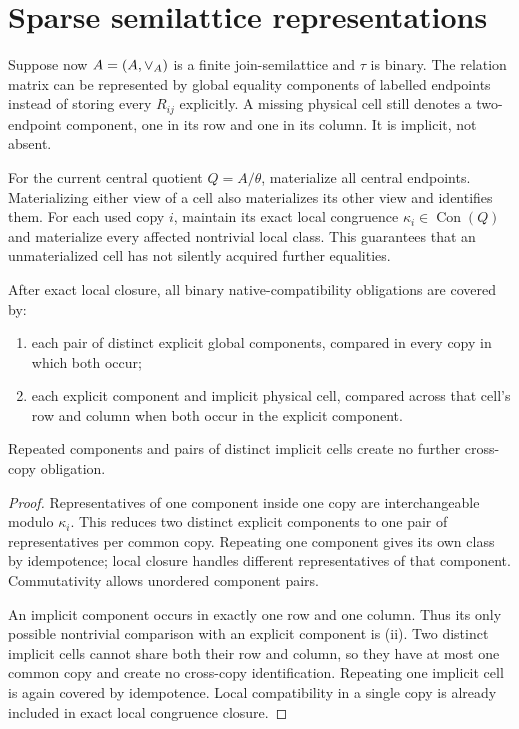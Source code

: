 \section{Sparse semilattice representations}\label{sec:sparse}

Suppose now $A=(A,\vee_A)$ is a finite join-semilattice and $\tau$ is binary. The relation matrix can be represented by global equality components of labelled endpoints instead of storing every $R_{ij}$ explicitly. A missing physical cell still denotes a two-endpoint component, one in its row and one in its column. It is implicit, not absent.

For the current central quotient $Q=A/\theta$, materialize all central endpoints. Materializing either view of a cell also materializes its other view and identifies them. For each used copy $i$, maintain its exact local congruence $\kappa_i\in\operatorname{Con}(Q)$ and materialize every affected nontrivial local class. This guarantees that an unmaterialized cell has not silently acquired further equalities.

\begin{lemma}\label{lem:coverage}
After exact local closure, all binary native-compatibility obligations are covered by:
\begin{enumerate}[label=(\roman*)]
\item each pair of distinct explicit global components, compared in every copy in which both occur;
\item each explicit component and implicit physical cell, compared across that cell's row and column when both occur in the explicit component.
\end{enumerate}
Repeated components and pairs of distinct implicit cells create no further cross-copy obligation.
\end{lemma}
\begin{proof}
Representatives of one component inside one copy are interchangeable modulo $\kappa_i$. This reduces two distinct explicit components to one pair of representatives per common copy. Repeating one component gives its own class by idempotence; local closure handles different representatives of that component. Commutativity allows unordered component pairs.

An implicit component occurs in exactly one row and one column. Thus its only possible nontrivial comparison with an explicit component is (ii). Two distinct implicit cells cannot share both their row and column, so they have at most one common copy and create no cross-copy identification. Repeating one implicit cell is again covered by idempotence. Local compatibility in a single copy is already included in exact local congruence closure.
\end{proof}

